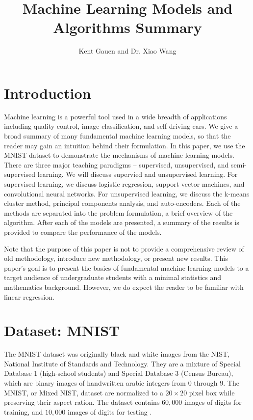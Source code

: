 \documentclass[11pt]{article}
\title{Machine Learning Models and Algorithms Summary}
\author{Kent Gauen and Dr. Xiao Wang}
\date{}
\begin{document}
\maketitle
\tableofcontents

\section{Introduction}
\par
    Machine learning is a powerful tool used in a wide breadth of applications including quality control, image classification, and self-driving cars. We give a broad summary of many fundamental machine learning models, so that the reader may gain an intuition behind their formulation. In this paper, we use the MNIST dataset to demonstrate the mechanisms of machine learning models. There are three major teaching paradigms --  supervised, unsupervised, and semi-supervised learning. We will discuss supervied and unsupervised learning. For supervised learning, we discuss logistic regression, support vector machines, and convolutional neural networks. For unsupervised learning, we discuss the k-means cluster method, principal components analysis, and auto-encoders. Each of the methods are separated into the problem formulation, a brief overview of the algorithm. After each of the models are presented, a summary of the results is provided to compare the performance of the models. 
\par
    Note that the purpose of this paper is not to provide a comprehensive review of old methodology, introduce new methodology, or present new results. This paper's goal is to present the basics of fundamental machine learning models to a target audience of undergraduate students with a minimal statistics and mathematics background. However, we do expect the reader to be familiar with linear regression.

\section{Dataset: MNIST}
The MNIST dataset was originally black and white images from the NIST, National Institute of Standards and Technology. They are a mixture of Special Database 1 (high-school students) and Special Database 3 (Census Bureau), which are binary images of handwritten arabic integers from $0$ through $9$. The MNIST, or Mixed NIST, dataset are normalized to a $20\times20$ pixel box while preserving their aspect ration. The dataset contains $60,000$ images of digits for training, and $10,000$ images of digits for testing \cite{mnist_lecun}. 
\end{document}
